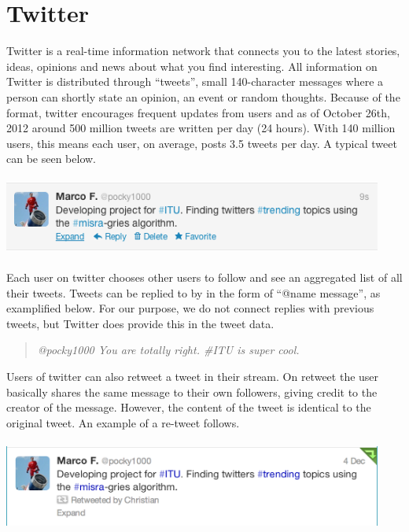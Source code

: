 \section{Twitter}
\label{twitter}
Twitter is a real-time information network that connects you to the latest stories, ideas, opinions and news about what you find interesting. All information on Twitter is distributed through ``tweets'', small 140-character messages where a person can shortly state an opinion, an event or random thoughts. Because of the format, twitter encourages frequent updates from users and as of October 26th, 2012 around 500 million tweets are written per day (24 hours)\cite{Cnet1}. With 140 million users, this means each user, on average, posts 3.5 tweets per day. A typical tweet can be seen below.
\\\\
\includegraphics[width=125mm]{tweet.png}
\\\\
Each user on twitter chooses other users to follow and see an aggregated list of all their tweets. Tweets can be replied to by in the form of ``@name message'', as examplified below. For our purpose, we do not connect replies with previous tweets, but Twitter does provide this in the tweet data.

\begin{quote}
    \emph{@pocky1000 You are totally right. \#ITU is super cool.}
\end{quote}

Users of twitter can also retweet a tweet in their stream. On retweet the user basically shares the same message to their own followers, giving credit to the creator of the message. However, the content of the tweet is identical to the original tweet. An example of a re-tweet follows.
\\\\
\includegraphics[width=125mm]{retweet.png}
\\\\
